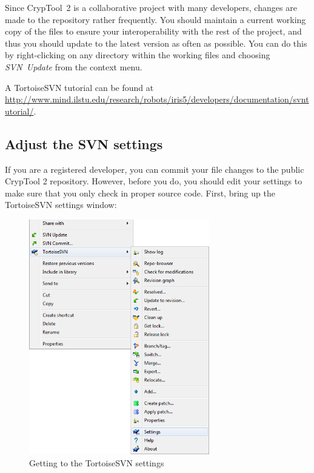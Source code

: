 Since CrypTool~2 is a collaborative project with many developers, changes are made to the repository rather frequently. You should maintain a current working copy of the files to ensure your interoperability with the rest of the project, and thus you should update to the latest version as often as possible. You can do this by right-clicking on any directory within the working files and choosing \textit{SVN~Update} from the context menu.

A TortoiseSVN tutorial can be found at \url{http://www.mind.ilstu.edu/research/robots/iris5/developers/documentation/svntutorial/}.
\clearpage

\subsection{Adjust the SVN settings}
\label{AdjustingTheSVNSettings}

If you are a registered developer, you can commit your file changes to the public CrypTool 2 repository. However, before you do, you should edit your settings to make sure that you only check in proper source code. First, bring up the TortoiseSVN settings window:

\begin{figure}[h!]
	\centering
		\includegraphics[width=0.70\textwidth]{figures/tortoise_svn_accessing_settings.png}
	\caption{Getting to the TortoiseSVN settings}
	\label{fig:tortoise_svn_accessing_settings}
\end{figure}
\clearpage

